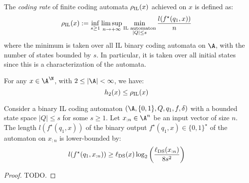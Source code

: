 \documentclass[toc]{../cs-classes/cs-classes}
\newcommand*{\lds}{\ell_{\textnormal{DS}}}
\begin{document}
\begin{definition}
    The \emph{coding rate} of finite coding automata $\rho_{\textnormal{IL}}(x)$ achieved on $x$ is defined as:
    \begin{equation*}
        \rho_{\textnormal{IL}}(x) := \inf_{s\geq1}\limsup_{n\to+\infty} \min_{\substack{\textnormal{IL automaton}\\|Q|\leq s}} \frac{l(f^\star(q_1, x))}{n}
    \end{equation*}
    where the minimum is taken over all IL binary coding automata on $\A$, with the number of states bounded by $s$. In particular, it is taken over all initial states since this is a characterization of the automata.
\end{definition}

\begin{property}
    For any $x\in\A^\N$, with $2\leq|\A|<\infty$, we have:
    \begin{equation*}
        h_2(x)\leq\rho_{\textnormal{IL}}(x)
    \end{equation*}
\end{property}

\begin{lemma}
    Consider a binary IL coding automaton $(\A, \{0, 1\}, Q, q_1, f, \delta)$ with a bounded state space $|Q|\leq s$ for some $s\geq1$. Let $x_{:n}\in\A^n$ be an input vector of size $n$. The length $l(f^\star(q_1, x))$ of the binary output $f^\star(q_1, x)\in\{0, 1\}^\star$ of the automaton on $x_{:n}$ is lower-bounded by:
    \begin{equation*}
        l(f^\star(q_1, x_{:n})) \geq \lds(x) \log_2\left(\frac{\lds(x_{:n})}{8s^2}\right)
    \end{equation*}
\end{lemma}

\begin{proof}
    TODO.
\end{proof}
\end{document}
